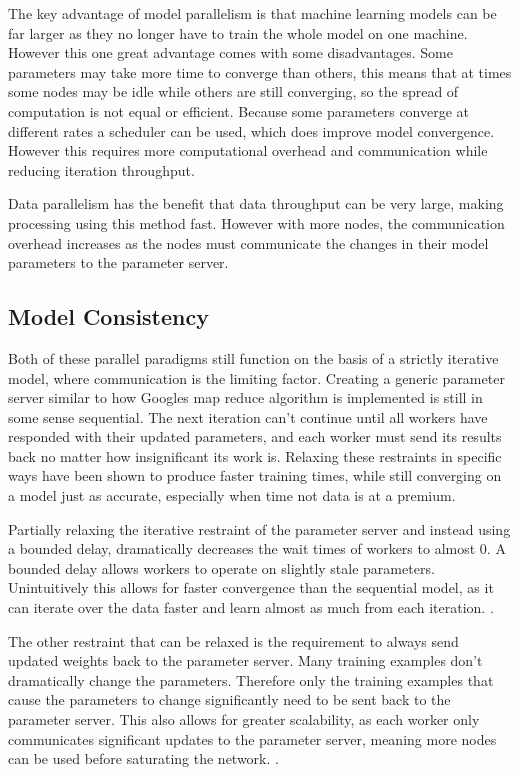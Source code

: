 The key advantage of model parallelism is that machine learning models can be
far larger as they no longer have to train the whole model on one machine.
However this one great advantage comes with some disadvantages. Some parameters
may take more time to converge than others, this means that at times some nodes
may be idle while others are still converging, so the spread of computation is
not equal or efficient. \cite{Dean2012Distbelief} Because some parameters
converge at different rates a scheduler can be used, which does improve model
convergence. However this requires more computational overhead and communication
while reducing iteration throughput.
\cite{kim2016STRADS}

Data parallelism has the benefit that data throughput can be very large, making
processing using this method fast. However with more nodes, the
communication overhead increases as the nodes must communicate the changes in
their model parameters to the parameter server. \cite{elgabli2020gadmm}

\subsection{Model Consistency}
Both of these parallel paradigms still function on the basis of a strictly
iterative model, where communication is the limiting factor. Creating a generic
parameter server similar to how Googles map reduce algorithm is implemented
\cite{googlemapreduce2008} is still in some sense sequential. The next iteration
can't continue until all workers have responded with their updated parameters,
and each worker must send its results back no matter how insignificant its work
is. Relaxing these restraints in specific ways have been shown to produce faster
training times, while still converging on a model just as accurate, especially
when time not data is at a premium.\cite{li2014communication}
\par
Partially relaxing the iterative restraint of the parameter server and instead
using a bounded delay, dramatically decreases the wait times of workers to
almost 0. A bounded delay allows workers to operate on slightly stale
parameters. Unintuitively this allows for faster convergence than the sequential
model, as it can iterate over the data faster and learn almost as much from each
iteration. \cite{li2014communication}.
\par
The other restraint that can be relaxed is the requirement to always send
updated weights back to the parameter server. Many training examples don't
dramatically change the parameters. Therefore only the training examples that
cause the parameters to change significantly need to be sent back to the
parameter server. This also allows for greater scalability, as each worker only
communicates significant updates to the parameter server, meaning more nodes can
be used before saturating the network. \cite{li2014communication}. 

